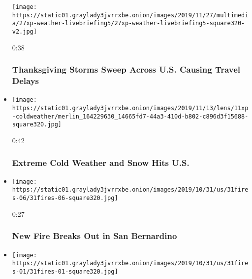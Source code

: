 \begin{itemize}
  \texttt{[image: https://static01.graylady3jvrrxbe.onion/images/2019/11/27/multimedia/27xp-weather-livebriefing5/27xp-weather-livebriefing5-square320-v2.jpg]}

  0:38

  \hypertarget{thanksgiving-storms-sweep-across-us-causing-travel-delays}{%
  \subsubsection{Thanksgiving Storms Sweep Across U.S. Causing Travel
  Delays}\label{thanksgiving-storms-sweep-across-us-causing-travel-delays}}
\item
  \href{https://www.nytimes3xbfgragh.onion/video/us/100000006820395/cold-front-snow.html?action=click\&module=video-series-bar\&region=header\&pgtype=Article\&playlistId=video/extreme-weather}{}

  \texttt{[image: https://static01.graylady3jvrrxbe.onion/images/2019/11/13/lens/11xp-coldweather/merlin\_164229630\_14665fd7-44a3-410d-b802-c896d3f15688-square320.jpg]}

  0:42

  \hypertarget{extreme-cold-weather-and-snow-hits-us}{%
  \subsubsection{Extreme Cold Weather and Snow Hits
  U.S.}\label{extreme-cold-weather-and-snow-hits-us}}
\item
  \href{https://www.nytimes3xbfgragh.onion/video/us/100000006800502/fire-san-bernardino.html?action=click\&module=video-series-bar\&region=header\&pgtype=Article\&playlistId=video/extreme-weather}{}

  \texttt{[image: https://static01.graylady3jvrrxbe.onion/images/2019/10/31/us/31fires-06/31fires-06-square320.jpg]}

  0:27

  \hypertarget{new-fire-breaks-out-in-san-bernardino}{%
  \subsubsection{New Fire Breaks Out in San
  Bernardino}\label{new-fire-breaks-out-in-san-bernardino}}
\item
  \href{https://www.nytimes3xbfgragh.onion/video/us/100000006797674/california-fires-simi-valley.html?action=click\&module=video-series-bar\&region=header\&pgtype=Article\&playlistId=video/extreme-weather}{}

  \texttt{[image: https://static01.graylady3jvrrxbe.onion/images/2019/10/31/us/31fires-01/31fires-01-square320.jpg]}


\end{itemize}
